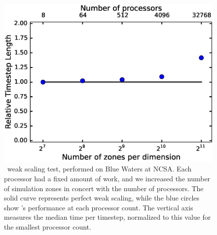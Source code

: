 \documentclass[12pt]{article}
\begin{document}
\begin{figure}
  \centering
  \includegraphics[scale=0.8]{plots/weak_scaling}
  \caption[\castro\ weak scaling test]
          {\castro\ weak scaling test, performed on Blue Waters at 
           NCSA. Each processor had a fixed amount of work, and we increased the 
           number of simulation zones in concert with the number of processors. The 
           solid curve represents perfect weak scaling, while the blue circles show 
           \castro's performance at each processor count. The vertical axis measures 
           the median time per timestep, normalized to this value for the smallest 
           processor count.
           \label{fig:weak_scaling}}
\end{figure}
\end{document}
